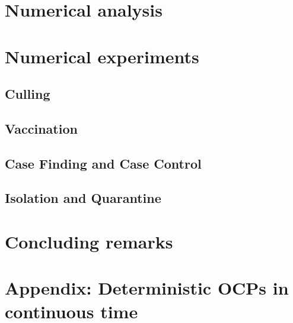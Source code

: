 \documentclass[titlepage]{amsart}
\begin{document}
  \section{Numerical analysis}
    
     \pagebreak
  \section{Numerical experiments}
    \subsection{Culling}
      
    \subsection{Vaccination}
      
    \subsection{Case Finding and Case Control}
      
    \subsection{Isolation and Quarantine}
      
%
%
%
  \section{Concluding remarks}
   
  \section{Appendix: Deterministic OCPs in continuous time}
    
%
%
  
  
\end{document}
